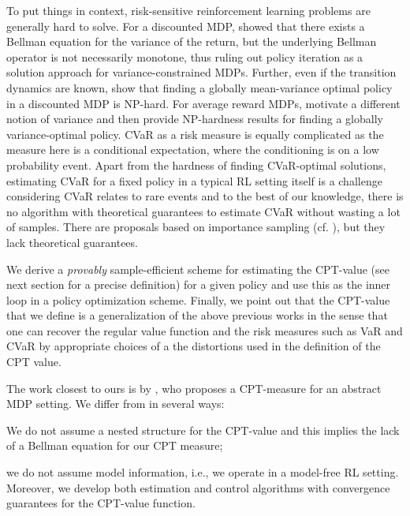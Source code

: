 To put things in context, risk-sensitive reinforcement learning problems are generally hard to solve. 
For a discounted MDP, \citet{Sobel82VD} showed that there exists a Bellman equation for the variance of the return, but the underlying Bellman operator is not necessarily monotone, thus ruling out policy iteration as a solution approach for variance-constrained MDPs.
Further, even if the transition dynamics are known, \citet{mannor2013algorithmic} show that finding a globally mean-variance optimal policy in a discounted MDP is NP-hard.
For average reward MDPs, \citet{filar1989variance} motivate a different notion of variance and then provide NP-hardness results for finding a globally variance-optimal policy.
CVaR as a risk measure is equally complicated as the measure here is a conditional expectation, where the conditioning is on a low probability event. Apart from the hardness of finding CVaR-optimal solutions, estimating CVaR for a fixed policy in a typical RL setting itself is a challenge considering CVaR relates to rare events and to the best of our knowledge, there is no algorithm with theoretical guarantees to estimate CVaR without wasting a lot of samples. There are proposals based on importance sampling (cf. \citealt{prashanth2014policy,tamar2014optimizing}), but they lack theoretical guarantees. 

We derive a \textit{provably} sample-efficient  scheme for estimating the CPT-value (see next section for a precise definition) for a given policy and use this as the inner loop in a policy optimization scheme. 
Finally, we point out that the CPT-value that we define is a generalization of the above previous works in the sense that one can recover the regular value function and the risk measures such as VaR and CVaR by appropriate choices of a the distortions used in the definition of the CPT value.

The work closest to ours is by \citet{lin2013stochastic}, who proposes a CPT-measure for an abstract MDP setting.
 We differ from \cite{lin2013stochastic} in several ways:
\begin{inparaenum}[\it (i)]
\item We do not assume a nested structure for the CPT-value %
and this implies the lack of a Bellman equation for our CPT measure;
\item we do not assume model information, i.e., we operate in a model-free RL setting. Moreover, we develop both estimation and control algorithms with convergence guarantees for the CPT-value function.
\end{inparaenum}

